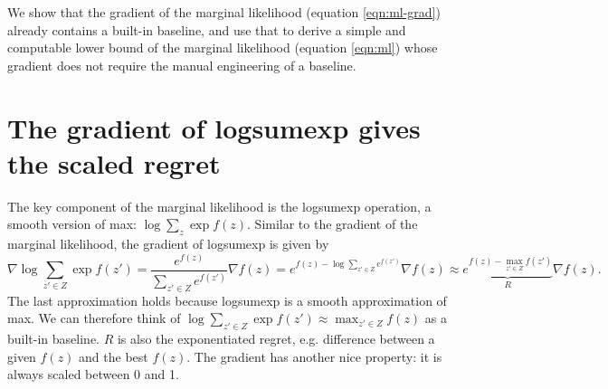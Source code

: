\documentclass[12pt]{article}
\begin{document}
We show that the gradient of the marginal likelihood (equation \ref{eqn:ml-grad}) already contains
a built-in baseline, and use that to derive a simple and computable lower bound of the marginal likelihood
(equation \ref{eqn:ml}) whose gradient does not require the manual engineering of a baseline.

\section{The gradient of logsumexp gives the scaled regret}
The key component of the marginal likelihood is the logsumexp operation,
a smooth version of max: $\log \sum_z \exp f(z)$.
Similar to the gradient of the marginal likelihood,
the gradient of logsumexp is given by
$$
\nabla \log \sum_{z'\in Z} \exp f(z')
= \frac{e^{f(z)}}{\sum_{z' \in Z} e^{f(z')}} \nabla f(z)
= e^{f(z) - \log \sum_{z' \in Z} e^{f(z')}} \nabla f(z)
\approx \underbrace{e^{f(z) - \max_{z' \in Z} f(z')}}_{R} \nabla f(z).
$$
The last approximation holds because logsumexp is a smooth approximation of max.
We can therefore think of $\log \sum_{z'\in Z}\exp f(z')\approx \max_{z'\in Z} f(z)$
as a built-in baseline.
$R$ is also the exponentiated regret, e.g. difference between a given $f(z)$
and the best $f(z)$.
The gradient has another nice property: it is always scaled between 0 and 1.
\end{document}
